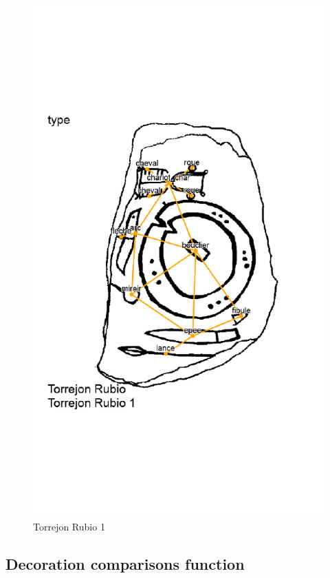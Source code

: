 \documentclass[article]{jss}\usepackage[]{graphicx}\usepackage[]{color}
\makeatletter
\def\maxwidth{ %
  \ifdim\Gin@nat@width>\linewidth
    \linewidth
  \else
    \Gin@nat@width
  \fi
}
\newenvironment{knitrout}{}{} %
\makeatother
\begin{document}
\begin{knitrout}
\begin{figure}[H]
{\centering \includegraphics[width=\maxwidth]{figure/unnamed-chunk-11-1} 

}

\caption{\label{fig:figs}Torrejon Rubio 1}\label{fig:unnamed-chunk-11}
\end{figure}


\end{knitrout}

\subsection{Decoration comparisons function} \label{sec:functions_one}
\end{document}
